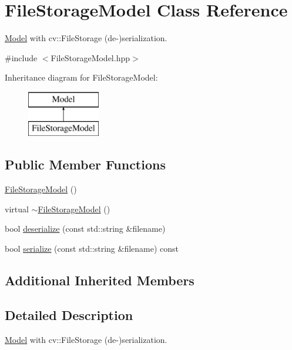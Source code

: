 \hypertarget{class_file_storage_model}{\section{File\-Storage\-Model Class Reference}
\label{class_file_storage_model}
}


\hyperlink{class_model}{Model} with cv\-::\-File\-Storage (de-\/)serialization.  




{\ttfamily \#include $<$File\-Storage\-Model.\-hpp$>$}

Inheritance diagram for File\-Storage\-Model\-:\begin{figure}[H]
\begin{center}
\leavevmode
\includegraphics[height=2.000000cm]{class_file_storage_model}
\end{center}
\end{figure}
\subsection*{Public Member Functions}
\begin{DoxyCompactItemize}
\item 
\hyperlink{class_file_storage_model_a4a9563fed1ae1a659466d64ee8890653}{File\-Storage\-Model} ()
\item 
virtual \hyperlink{class_file_storage_model_aba448d7c91c33e63cdfc95c8580fd834}{$\sim$\-File\-Storage\-Model} ()
\item 
bool \hyperlink{class_file_storage_model_af97e8cf0ced06893ffca6ec119a31143}{deserialize} (const std\-::string \&filename)
\item 
bool \hyperlink{class_file_storage_model_acc945cf6792663f84f1302e926dca63d}{serialize} (const std\-::string \&filename) const 
\end{DoxyCompactItemize}
\subsection*{Additional Inherited Members}


\subsection{Detailed Description}
\hyperlink{class_model}{Model} with cv\-::\-File\-Storage (de-\/)serialization. 

